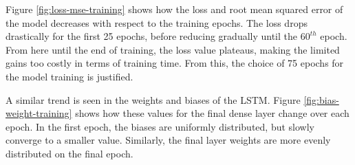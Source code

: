 \begin{center}
    \label{fig:loss-mse-training}
    \qquad
\end{center}

Figure \ref{fig:loss-mse-training} shows how the loss and root mean squared error of the model decreases with respect to the training epochs. The loss drops drastically for the first 25 epochs, before reducing gradually until the $60^{th}$ epoch. From here until the end of training, the loss value plateaus, making the limited gains too costly in terms of training time. From this, the choice of 75 epochs for the model training is justified.\par

A similar trend is seen in the weights and biases of the LSTM. Figure \ref{fig:bias-weight-training} shows how these values for the final dense layer change over each epoch. In the first epoch, the biases are uniformly distributed, but slowly converge to a smaller value. Similarly, the final layer weights are more evenly distributed on the final epoch.\par

